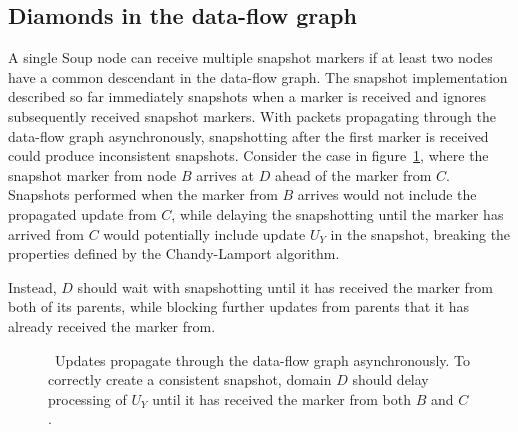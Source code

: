 \subsection{Diamonds in the data-flow graph}

A single Soup node can receive multiple snapshot markers if at least two nodes
have a common descendant in the data-flow graph. The snapshot implementation
described so far immediately snapshots when a marker is received and ignores
subsequently received snapshot markers. With packets propagating through the
data-flow graph asynchronously, snapshotting after the first marker is received
could produce inconsistent snapshots. Consider the case in
figure~\ref{fig:diamond}, where the snapshot marker from node $ B $ arrives at $
D $ ahead of the marker from $ C $. Snapshots performed when the marker from $ B
$ arrives would not include the propagated update from $ C $, while delaying the
snapshotting until the marker has arrived from $ C $ would potentially include
update $ U_Y $ in the snapshot, breaking the properties defined by the
Chandy-Lamport algorithm.

Instead, $ D $ should wait with snapshotting until it has received the marker
from both of its parents, while blocking further updates from parents that it
has already received the marker from.

\begin{figure}
  \centering
  
  \caption{\
    Updates propagate through the data-flow graph asynchronously. To correctly
    create a consistent snapshot, domain $ D $ should delay processing of $ U_Y
    $ until it has received the marker from both $ B $ and $ C $.
  }\label{fig:diamond}
\end{figure}
